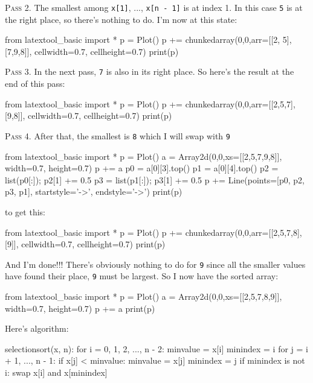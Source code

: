 \textsc{Pass 2.}
The smallest among \verb!x[1]!, ..., \verb!x[n - 1]! is at index 1.
In this case \verb!5! is at the right place, so there's
nothing to do.
I'm now at this state:

\begin{python}
from latextool_basic import *
p = Plot()
p += chunkedarray(0,0,arr=[[2, 5],[7,9,8]], cellwidth=0.7, cellheight=0.7)
print(p)
\end{python}

\textsc{Pass 3.}
In the next pass, \verb!7! is also in its right place.
So here's the result at the end of this pass:

\begin{python}
from latextool_basic import *
p = Plot()
p += chunkedarray(0,0,arr=[[2,5,7],[9,8]], cellwidth=0.7, cellheight=0.7)
print(p)
\end{python}

\textsc{Pass 4.}
After that, the smallest is \verb!8! which I will swap with 
\verb!9! 

\begin{python}
from latextool_basic import *
p = Plot()
a = Array2d(0,0,xs=[[2,5,7,9,8]], width=0.7, height=0.7)
p += a
p0 = a[0][3].top()
p1 = a[0][4].top()
p2 = list(p0[:]); p2[1] += 0.5
p3 = list(p1[:]); p3[1] += 0.5
p += Line(points=[p0, p2, p3, p1], startstyle='->', endstyle='->')
print(p)
\end{python}

to get this:

\begin{python}
from latextool_basic import *
p = Plot()
p += chunkedarray(0,0,arr=[[2,5,7,8],[9]], cellwidth=0.7, cellheight=0.7)
print(p)
\end{python}


And I'm done!!!
There's obviously nothing to do for \verb!9! since all the smaller
values have found their place, \verb!9! must be largest.
So I now have the sorted array:

\begin{python}
from latextool_basic import *
p = Plot()
a = Array2d(0,0,xs=[[2,5,7,8,9]], width=0.7, height=0.7)
p += a
print(p)
\end{python}


Here's algorithm:
\begin{console}
selectionsort(x, n):
    for i = 0, 1, 2, ..., n - 2:
        minvalue = x[i]
        minindex = i
        for j = i + 1, ..., n - 1:
            if x[j] < minvalue:
                minvalue = x[j]
                minindex = j
        if minindex is not i:
            swap x[i] and x[minindex]
\end{console}

